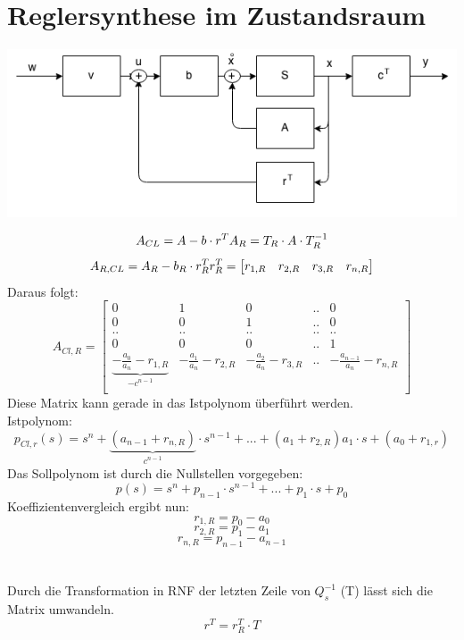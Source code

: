 \section{Reglersynthese im Zustandsraum}
\begin{center}
	\includegraphics[scale = 0.4]{images/zustandsregler.png}
\end{center}
\[
	A_{CL}= A-b\cdot r^T	\\ A_R=T_R\cdot A \cdot T_R^{-1}
\]
\[
	A_{R,CL}= A_R-b_R\cdot r_R^T	\\	r_R^T=
		\begin{bmatrix}
				r_{1,R}	&	r_{2,R}	& r_{3,R} &r_{n,R}\\
		\end{bmatrix}
\]
Daraus folgt:
\[
		A_{Cl,R}=
		\begin{bmatrix}
			0 &	1 & 0 & .. & 0\\
			0 & 0 & 1 & .. & 0\\
			.. & .. & .. &.. & .. \\
			0 & 0 & 0 & .. & 1\\
				\underbrace{
					-\frac{a_0}{a_n}-r_{1,R} 
				}_{\textbf{$-c^{n-1}$}}
		 &-\frac{a_1}{a_n}-r_{2,R} & -\frac{a_2}{a_n}-r_{3,R} &.. &-\frac{a_{n-1}}{a_n}-r_{n,R}\\	
		\end{bmatrix}
\]
Diese Matrix kann gerade in das Istpolynom überführt werden.
\\
Istpolynom:
\[
	p_{Cl,r}(s)=s^n+
	\underbrace{(a_{n-1}+r_{n,R})	}_{\textbf{$c^{n-1}$}}
	\cdot s^{n-1}+...+(a_{1}+r_{2,R})a_1\cdot s +(a_0+r_{1,r})
\]
Das Sollpolynom ist durch die Nullstellen vorgegeben:
\[
	p(s)=s^n+p_{n-1}\cdot s^{n-1}+...+p_1\cdot s +p_0
\]
Koeffizientenvergleich ergibt nun:
\[
	r_{1,R}=p_0-a_0
\]
\[
	r_{2,R}=p_1-a_1
\]
\[
	r_{n,R}=p_{n-1}-a_{n-1}
\]
\\
\\
Durch die Transformation in RNF der letzten Zeile von $Q_s^{-1}$ (T) lässt sich die Matrix umwandeln.
\[
	r^T=r_R^T \cdot T
\]


